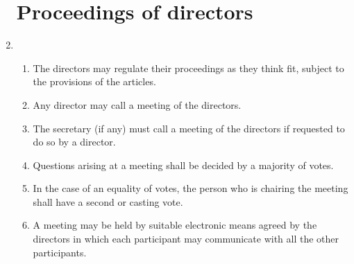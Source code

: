 \documentclass{article}
\begin{document}
\begin{enumerate}[label=\arabic*, start=23]
    \section{Proceedings of directors}
    \item \begin{enumerate}[label=(\arabic*)]
        \item The directors may regulate their proceedings as they think fit,
        subject to the provisions of the articles.
        \item Any director may call a meeting of the directors.
        \item The secretary (if any) must call a meeting of the directors if
        requested to do so by a director.
        \item Questions arising at a meeting shall be decided by a majority
        of votes.
        \item In the case of an equality of votes, the person who is chairing
        the meeting shall have a second or casting vote.
        \item A meeting may be held by suitable electronic means agreed by
        the directors in which each participant may communicate with
        all the other participants.
    \end{enumerate}
    

\end{enumerate}
\end{document}
